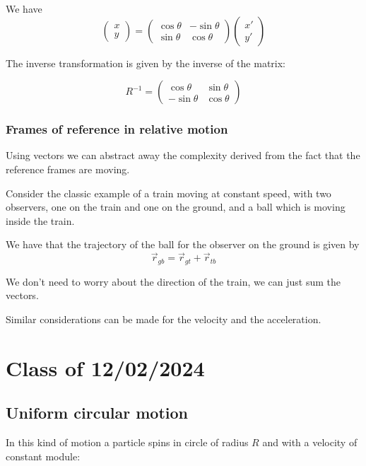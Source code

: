 \documentclass[14pt]{extarticle}
\begin{document}
We have
$$
  \begin{pmatrix}
    x \\
    y
  \end{pmatrix}
  =
  \begin{pmatrix}
    \cos \theta & -\sin \theta \\
    \sin \theta & \cos \theta
  \end{pmatrix}
  \begin{pmatrix}
    x' \\
    y'
  \end{pmatrix}
$$

The inverse transformation is given by the inverse of the matrix:

$$
  R^{-1} = \begin{pmatrix}
    \cos \theta  & \sin \theta \\
    -\sin \theta & \cos \theta
  \end{pmatrix}
$$

\subsubsection{Frames of reference in relative motion}

Using vectors we can abstract away the complexity derived from the fact that the reference frames are moving.

Consider the classic example of a train moving at constant speed, with two observers, one on the train and one on the ground,
and a ball which is moving inside the train.

We have that the trajectory of the ball for the observer on the ground is given by
$$
  \vec{r}_{gb} = \vec{r}_{gt} + \vec{r}_{tb}
$$

We don't need to worry about the direction of the train, we can just sum the vectors.

Similar considerations can be made for the velocity and the acceleration.

\section{Class of 12/02/2024}

\subsection {Uniform circular motion}

In this kind of motion a particle spins in circle of radius $R$
and with a velocity of constant module:
\end{document}
